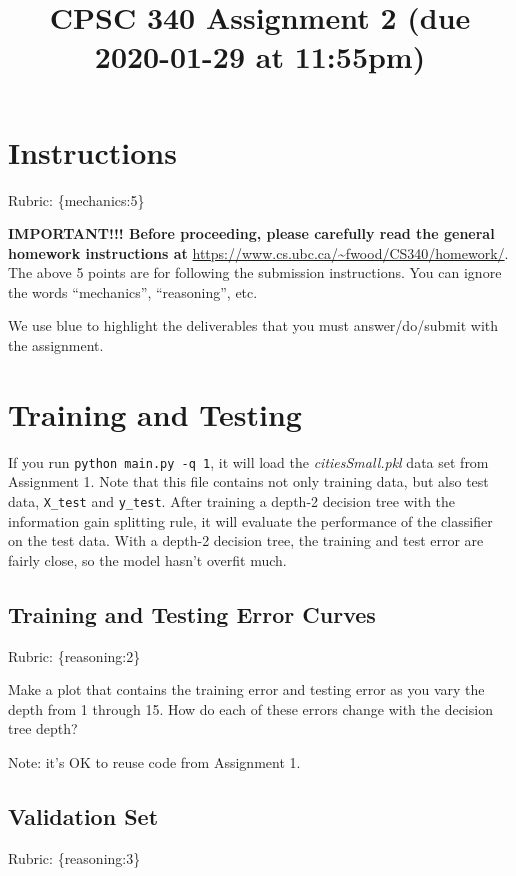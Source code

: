 \documentclass{article}
\def\rubric#1{\gre{Rubric: \{#1\}}}{}
\def\blu#1{{\color{blu}#1}}
\def\gre#1{{\color{gre}#1}}
\begin{document}
\title{CPSC 340 Assignment 2 (due 2020-01-29 at 11:55pm)}
\author{}
\date{}
\maketitle
\vspace{-4em}

\section*{Instructions}
\rubric{mechanics:5}

\textbf{IMPORTANT!!! Before proceeding, please carefully read the general homework instructions at} \url{https://www.cs.ubc.ca/~fwood/CS340/homework/}. The above 5 points are for following the submission instructions. You can ignore the words ``mechanics'', ``reasoning'', etc.

\vspace{1em}
We use \blu{blue} to highlight the deliverables that you must answer/do/submit with the assignment.

\section{Training and Testing}
If you run \texttt{python main.py \string-q 1}, it will load the \emph{citiesSmall.pkl} data set from Assignment 1.
Note that this file contains not only training data, but also test data, \texttt{X\string_test} and \texttt{y\string_test}.
After training a depth-2 decision tree with the information gain splitting rule, it will evaluate the performance of the classifier on the test data.
With a depth-2 decision tree, the training and test error are fairly close, so the model hasn't overfit much.

\subsection{Training and Testing Error Curves}
\rubric{reasoning:2}

\blu{Make a plot that contains the training error and testing error as you vary the depth from 1 through 15. How do each of these errors change with the decision tree depth?}

Note: it's OK to reuse code from Assignment 1.


\subsection{Validation Set}
\rubric{reasoning:3}
\end{document}
